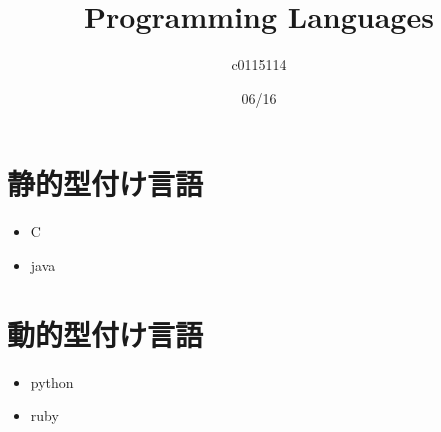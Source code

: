 \documentclass[uplatex]{jsarticle}
\title{Programming Languages}
\author{c0115114}
\date{06/16}
\begin{document}
\maketitle

\section{静的型付け言語}

\begin{itemize}
 \item C
 \item java
\end{itemize}
\section{動的型付け言語}

\begin{itemize}
 \item python
 \item ruby
\end{itemize}
\end{document}
